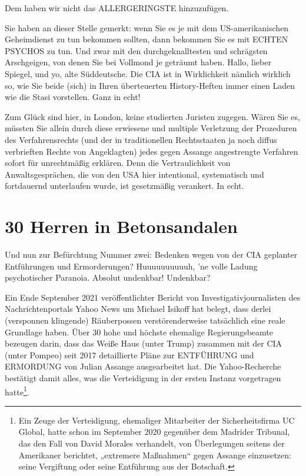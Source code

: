 \begin{multicols}{2}
Dem haben wir nicht das ALLERGERINGSTE hinzuzufügen.

Sie haben an dieser Stelle gemerkt: wenn Sie es je mit
dem US-amerikanischen Geheimdienst zu tun bekommen sollten, dann bekommen Sie es mit ECHTEN PSYCHOS zu tun. Und zwar mit den durchgeknalltesten und
schrägsten Arschgeigen, von denen Sie bei Vollmond je
geträumt haben. Hallo, lieber Spiegel, und yo, alte Süddeutsche. Die CIA ist in Wirklichkeit nämlich wirklich so,
wie Sie beide (sich) in Ihren überteuerten History-Heften immer einen Laden wie die Stasi vorstellen. Ganz in
echt!

Zum Glück sind hier, in London, keine studierten Juristen zugegen. Wären Sie es, müssten Sie allein durch
diese erwiesene und multiple Verletzung der Prozeduren
des Verfahrensrechts (und der in traditionellen Rechtsstaaten ja noch diffus verbrieften Rechte von Angeklagten) jedes gegen Assange angestrengte Verfahren sofort
für unrechtmäßig erklären. Denn die Vertraulichkeit von
Anwaltsgesprächen, die von den USA hier intentional,
systematisch und fortdauernd unterlaufen wurde, ist
gesetzmäßig verankert. In echt.



\chapter{30 Herren in Betonsandalen} %

Und nun zur Befürchtung Nummer zwei: Bedenken wegen von der CIA geplanter Entführungen und Ermorderungen? Huuuuuuuuuuh, ’ne volle Ladung psychotischer Paranoia. Absolut undenkbar! Undenkbar?

Ein Ende September 2021 veröffentlichter Bericht von
Investigativjournalisten des Nachrichtenportals Yahoo
News um Michael Isikoff hat belegt, dass derlei (versponnen klingende) Räuberpossen verstörenderweise
tatsächlich eine reale Grundlage haben. Über 30 hohe
und höchste ehemalige Regierungsbeamte bezeugen
darin, dass das Weiße Haus (unter Trump) zusammen
mit der CIA (unter Pompeo) seit 2017 detaillierte Pläne
zur ENTFÜHRUNG und ERMORDUNG von Julian Assange ausgearbeitet hat. Die Yahoo-Recherche bestätigt
damit alles, was die Verteidigung in der ersten Instanz
vorgetragen hatte\footnote[18]{Ein Zeuge der Verteidigung, ehemaliger Mitarbeiter der Sicherheitsfirma UC Global, hatte schon im September
2020 gegenüber dem Madrider Tribunal, das den Fall von David Morales verhandelt, von Überlegungen seitens
der Amerikaner berichtet, „extremere Maßnahmen“ gegen Assange einzusetzen: seine Vergiftung oder seine
Entführung aus der Botschaft.}.


\end{multicols}
